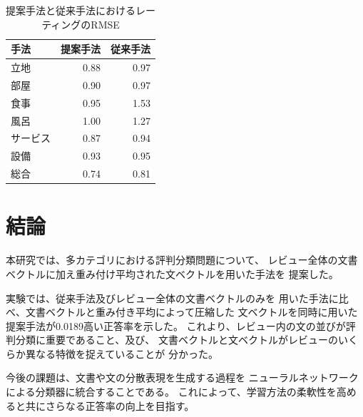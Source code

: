 \documentclass[twocolumn,a4paper]{ltjarticle}
\begin{document}
\begin{table}[b!]
  \caption{提案手法と従来手法\cite{fujitani15}におけるレーティングのRMSE}
  \centering
  \begin{tabular}{l | r r} \label{tab:RMSEs}
    手法 & 提案手法 & 従来手法\cite{fujitani15} \\
    \hline
    立地      & 0.88 & 0.97 \\
    部屋      & 0.90 & 0.97 \\
    食事      & 0.95 & 1.53 \\
    風呂      & 1.00 & 1.27 \\
    サービス  & 0.87 & 0.94 \\
    設備      & 0.93 & 0.95 \\
    総合      & 0.74 & 0.81 \\
  \end{tabular}
\end{table}



\section{結論}

本研究では、多カテゴリにおける評判分類問題について、
レビュー全体の文書ベクトルに加え重み付け平均された文ベクトルを用いた手法を
提案した。

実験では、従来手法\cite{fujitani15}及びレビュー全体の文書ベクトルのみを
用いた手法に比べ、文書ベクトルと重み付き平均によって圧縮した
文ベクトルを同時に用いた提案手法が0.0189高い正答率を示した。
これより、レビュー内の文の並びが評判分類に重要であること、及び、
文書ベクトルと文ベクトルがレビューのいくらか異なる特徴を捉えていることが
分かった。

今後の課題は、文書や文の分散表現を生成する過程を
ニューラルネットワークによる分類器に統合することである。
これによって、学習方法の柔軟性を高めると共にさらなる正答率の向上を目指す。

%
%
\end{document}
